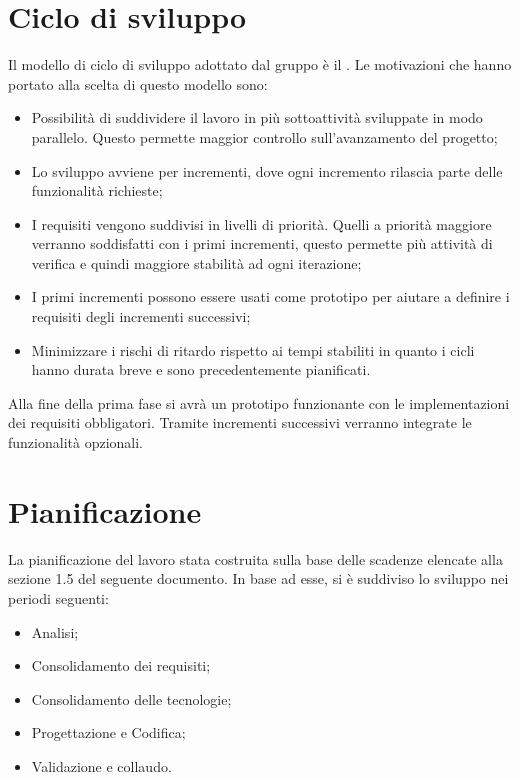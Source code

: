 \documentclass[../PianodiProgetto.tex]{subfiles}
\begin{document}
	
	\chapter{Ciclo di sviluppo}
	
	Il modello di ciclo di sviluppo adottato dal gruppo è il . Le motivazioni che hanno portato alla scelta di questo modello sono:
	\begin{itemize}
		\item Possibilità di suddividere il lavoro in più sottoattività sviluppate in modo parallelo. Questo permette maggior controllo sull’avanzamento del progetto;
		\item Lo sviluppo avviene per incrementi, dove ogni incremento rilascia parte delle funzionalità richieste;
		\item I requisiti vengono suddivisi in livelli di priorità. Quelli a priorità maggiore verranno soddisfatti con i primi incrementi, questo permette più attività di verifica e quindi maggiore stabilità ad ogni iterazione;
		\item I primi incrementi possono essere usati come prototipo per aiutare a definire i requisiti degli incrementi successivi;
		\item Minimizzare i rischi di ritardo rispetto ai tempi stabiliti in quanto i cicli hanno durata breve e sono precedentemente pianificati.
	\end{itemize}
	Alla fine della prima fase si avrà un prototipo funzionante con le implementazioni dei requisiti obbligatori. Tramite incrementi successivi verranno integrate le funzionalità opzionali.
	
	\chapter{Pianificazione}
	
	La pianificazione del lavoro stata costruita sulla base delle scadenze elencate alla sezione 1.5 del seguente documento. In base ad esse, si è suddiviso lo sviluppo nei periodi seguenti:
	\begin{itemize}
		\item Analisi;
		\item Consolidamento dei requisiti;
		\item Consolidamento delle tecnologie;
		\item Progettazione e Codifica;
		\item Validazione e collaudo.
	\end{itemize}
	\newpage
\end{document}
